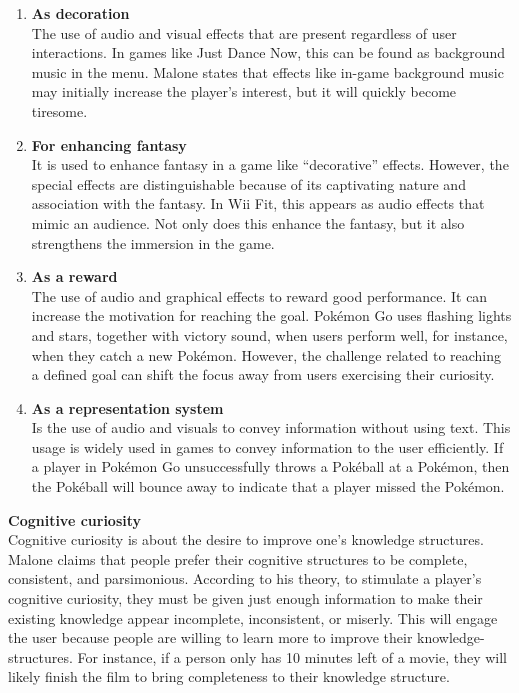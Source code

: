 \documentclass[../Main.tex]{subfiles}
\begin{document}
\begin{enumerate}
    \item \textbf{As decoration} \\
    The use of audio and visual effects that are present regardless of user interactions. In games like Just Dance Now, this can be found as background music in the menu. Malone states that effects like in-game background music may initially increase the player’s interest, but it will quickly become tiresome.
    \item \textbf{For enhancing fantasy} \\
    It is used to enhance fantasy in a game like “decorative” effects. However, the special effects are distinguishable because of its captivating nature and association with the fantasy. In Wii Fit, this appears as audio effects that mimic an audience. Not only does this enhance the fantasy, but it also strengthens the immersion in the game.
    \item \textbf{As a reward} \\
    The use of audio and graphical effects to reward good performance. It can increase the motivation for reaching the goal. Pokémon Go uses flashing lights and stars, together with victory sound, when users perform well, for instance, when they catch a new Pokémon. However, the challenge related to reaching a defined goal can shift the focus away from users exercising their curiosity.
    \item \textbf{As a representation system} \\
    Is the use of audio and visuals to convey information without using text. This usage is widely used in games to convey information to the user efficiently. If a player in Pokémon Go unsuccessfully throws a Pokéball at a Pokémon, then the Pokéball will bounce away to indicate that a player missed the Pokémon.
\end{enumerate}

\textbf{Cognitive curiosity} \\
Cognitive curiosity is about the desire to improve one’s knowledge structures. Malone claims that people prefer their cognitive structures to be complete, consistent, and parsimonious. According to his theory, to stimulate a player’s cognitive curiosity, they must be given just enough information to make their existing knowledge appear incomplete, inconsistent, or miserly. This will engage the user because people are willing to learn more to improve their knowledge-structures. For instance, if a person only has 10 minutes left of a movie, they will likely finish the film to bring completeness to their knowledge structure.
\end{document}

